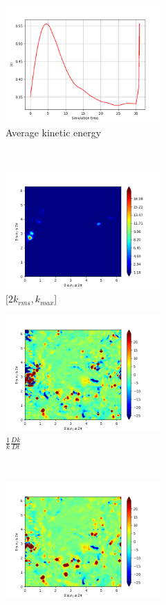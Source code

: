 \begin{figure}[H]
    \begin{subfigure}[H]{0.45\textwidth}
        \includegraphics[height=1.75in]{media/run-cds-65/ke-average1480.png}
        \caption{Average kinetic energy}
    \end{subfigure}
    ~
    \begin{subfigure}[H]{0.45\textwidth}
        \includegraphics[height=1.75in]{media/run-cds-65/ke-2-1480.png}
        \caption{$[2k_{rms}, k_{max} $] }
    \end{subfigure}
    \newline
    \begin{subfigure}[H]{0.45\textwidth}
        \includegraphics[height=1.75in]{media/run-cds-65/ke-1480.png}
        \caption{$\frac{1}{k} \frac{D k}{Dt}$}
    \end{subfigure}
    ~
    \begin{subfigure}{0.45\textwidth}
        \includegraphics[height=1.75in]{media/run-cds-65/A-ke-1480.png}

\end{subfigure}
\end{figure}
